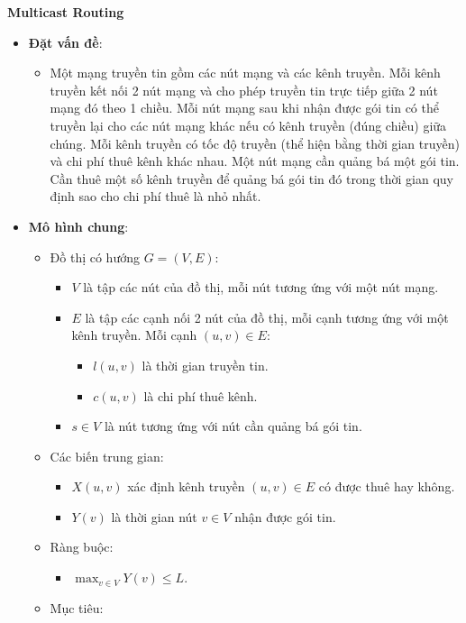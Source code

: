 \documentclass{article}
\begin{document}
\textbf{Multicast Routing}

\begin{itemize}
	\item \textbf{Đặt vấn đề}:
	\begin{itemize}
		\item Một mạng truyền tin gồm các nút mạng và các kênh truyền. Mỗi kênh truyền kết nối 2 nút mạng và cho phép truyền tin trực tiếp giữa 2 nút mạng đó theo 1 chiều. Mỗi nút mạng sau khi nhận được gói tin có thể truyền lại cho các nút mạng khác nếu có kênh truyền (đúng chiều) giữa chúng. Mỗi kênh truyền có tốc độ truyền (thể hiện bằng thời gian truyền) và chi phí thuê kênh khác nhau. Một nút mạng cần quảng bá một gói tin. Cần thuê một số kênh truyền để quảng bá gói tin đó trong thời gian quy định sao cho chi phí thuê là nhỏ nhất.
	\end{itemize}
	\item \textbf{Mô hình chung}:
	\begin{itemize}
		\item Đồ thị có hướng $G = (V, E)$:
		\begin{itemize}
			\item $V$ là tập các nút của đồ thị, mỗi nút tương ứng với một nút mạng.
			\item $E$ là tập các cạnh nối 2 nút của đồ thị, mỗi cạnh tương ứng với một kênh truyền. Mỗi cạnh $(u, v) \in E$:
			\begin{itemize}
				\item $l(u, v)$ là thời gian truyền tin.
				\item $c(u, v)$ là chi phí thuê kênh.
			\end{itemize}
			\item $s \in V$ là nút tương ứng với nút cần quảng bá gói tin.
		\end{itemize}
		\item Các biến trung gian:
		\begin{itemize}
			\item $X(u, v)$ xác định kênh truyền $(u, v) \in E$ có được thuê hay không.
			\item $Y(v)$ là thời gian nút $v \in V$ nhận được gói tin.
		\end{itemize}
		\item Ràng buộc:
		\begin{itemize}
			\item $\max_{v \in V} Y(v) \leq L$.
		\end{itemize}
		\item {Mục tiêu}:
		\begin{itemize}

\end{itemize}
\end{itemize}
\end{itemize}
\end{document}
